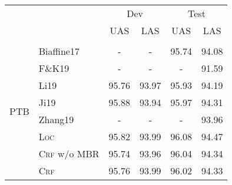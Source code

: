 \begin{table}[tb!]
    \centering
    \begin{tabular}{llcccc}
        \toprule
                                 &                        & \multicolumn{2}{c}{Dev} & \multicolumn{2}{c}{Test}                                                                       \\
                                 &                        & UAS                     & LAS                      & UAS                              & LAS                              \\[2pt]
        \hline
        \\[-15pt]
        \multirow{10}{*}{PTB}    & Biaffine17             & -                       & -                        & 95.74                            & 94.08                            \\
                                 & F\&K19                 & -                       & -                        & -                                & 91.59                            \\
                                 & Li19                   & 95.76                   & 93.97                    & 95.93                            & 94.19                            \\
                                 & Ji19                   & 95.88                   & 93.94                    & 95.97                            & 94.31                            \\
                                 & Zhang19                & -                       & -                        & -                                & 93.96                            \\[3pt]
                                 & \textsc{Loc}           & 95.82                   & 93.99                    & 96.08                            & 94.47                            \\
                                 & \textsc{Crf} w/o MBR   & 95.74                   & 93.96                    & 96.04                            & 94.34                            \\
                                 & \textsc{Crf}           & 95.76                   & 93.99                    & 96.02                            & 94.33                            \\

\end{tabular}
\end{table}
